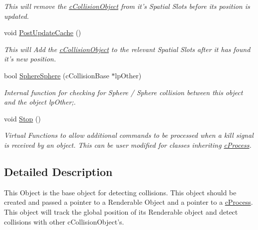 \begin{DoxyCompactItemize}
\begin{DoxyCompactList}\small\item\em This will remove the \hyperlink{classc_collision_object}{cCollisionObject} from it's Spatial Slots before its position is updated. \end{DoxyCompactList}\item 
\hypertarget{classc_collision_object_a7719840f3fcc5bf3dcef08d123066739}{
void \hyperlink{classc_collision_object_a7719840f3fcc5bf3dcef08d123066739}{PostUpdateCache} ()}
\label{classc_collision_object_a7719840f3fcc5bf3dcef08d123066739}

\begin{DoxyCompactList}\small\item\em This will Add the \hyperlink{classc_collision_object}{cCollisionObject} to the relevant Spatial Slots after it has found it's new position. \end{DoxyCompactList}\item 
\hypertarget{classc_collision_object_aa05f370617943b2a0ef8560e3f8048a3}{
bool \hyperlink{classc_collision_object_aa05f370617943b2a0ef8560e3f8048a3}{SphereSphere} (cCollisionBase $\ast$lpOther)}
\label{classc_collision_object_aa05f370617943b2a0ef8560e3f8048a3}

\begin{DoxyCompactList}\small\item\em Internal function for checking for Sphere / Sphere collision between this object and the object lpOther;. \end{DoxyCompactList}\item 
\hypertarget{classc_collision_object_a0d785a464cb0c6ca7e43dd79ce167473}{
void \hyperlink{classc_collision_object_a0d785a464cb0c6ca7e43dd79ce167473}{Stop} ()}
\label{classc_collision_object_a0d785a464cb0c6ca7e43dd79ce167473}

\begin{DoxyCompactList}\small\item\em Virtual Functions to allow additional commands to be processed when a kill signal is received by an object. This can be user modified for classes inheriting \hyperlink{classc_process}{cProcess}. \end{DoxyCompactList}\end{DoxyCompactItemize}


\subsection{Detailed Description}
This Object is the base object for detecting collisions. This object should be created and passed a pointer to a Renderable Object and a pointer to a \hyperlink{classc_process}{cProcess}. This object will track the global position of its Renderable object and detect collisions with other cCollisionObject's. 

